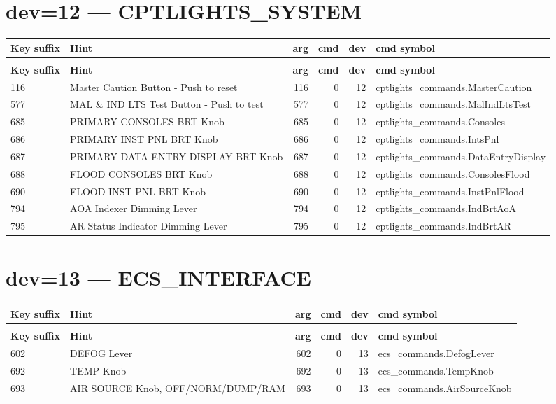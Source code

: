 \documentclass[10pt,a4paper]{article}
\begin{document}
\section{dev=12 — CPTLIGHTS\_SYSTEM}
\begin{longtable}{>{\ttfamily\small}p{38mm} >{\small}p{72mm} r r r >{\ttfamily\small}p{48mm}}
\toprule
\textbf{Key suffix} & \textbf{Hint} & \textbf{arg} & \textbf{cmd} & \textbf{dev} & \textbf{cmd symbol} \\
\midrule
\endfirsthead
\multicolumn{6}{l}{\small\itshape continued\ldots}\\
\toprule
\textbf{Key suffix} & \textbf{Hint} & \textbf{arg} & \textbf{cmd} & \textbf{dev} & \textbf{cmd symbol} \\
\midrule
\endhead
\bottomrule
\endfoot
\rowcolor{rowodd}
  116 & Master Caution Button - Push to reset & 116 & 0 & 12 & cptlights\_commands.MasterCaution \\
  577 & MAL \& IND LTS Test Button - Push to test & 577 & 0 & 12 & cptlights\_commands.MalIndLtsTest \\
\rowcolor{rowodd}
  685 & PRIMARY CONSOLES BRT Knob & 685 & 0 & 12 & cptlights\_commands.Consoles \\
  686 & PRIMARY INST PNL BRT Knob & 686 & 0 & 12 & cptlights\_commands.IntsPnl \\
\rowcolor{rowodd}
  687 & PRIMARY DATA ENTRY DISPLAY BRT Knob & 687 & 0 & 12 & cptlights\_commands.DataEntryDisplay \\
  688 & FLOOD CONSOLES BRT Knob & 688 & 0 & 12 & cptlights\_commands.ConsolesFlood \\
\rowcolor{rowodd}
  690 & FLOOD INST PNL BRT Knob & 690 & 0 & 12 & cptlights\_commands.InstPnlFlood \\
  794 & AOA Indexer Dimming Lever & 794 & 0 & 12 & cptlights\_commands.IndBrtAoA \\
\rowcolor{rowodd}
  795 & AR Status Indicator Dimming Lever & 795 & 0 & 12 & cptlights\_commands.IndBrtAR \\
\end{longtable}
\section{dev=13 — ECS\_INTERFACE}
\begin{longtable}{>{\ttfamily\small}p{38mm} >{\small}p{72mm} r r r >{\ttfamily\small}p{48mm}}
\toprule
\textbf{Key suffix} & \textbf{Hint} & \textbf{arg} & \textbf{cmd} & \textbf{dev} & \textbf{cmd symbol} \\
\midrule
\endfirsthead
\multicolumn{6}{l}{\small\itshape continued\ldots}\\
\toprule
\textbf{Key suffix} & \textbf{Hint} & \textbf{arg} & \textbf{cmd} & \textbf{dev} & \textbf{cmd symbol} \\
\midrule
\endhead
\bottomrule
\endfoot
\rowcolor{rowodd}
  602 & DEFOG Lever & 602 & 0 & 13 & ecs\_commands.DefogLever \\
  692 & TEMP Knob & 692 & 0 & 13 & ecs\_commands.TempKnob \\
\rowcolor{rowodd}
  693 & AIR SOURCE Knob, OFF/NORM/DUMP/RAM & 693 & 0 & 13 & ecs\_commands.AirSourceKnob \\
\end{longtable}
\end{document}
